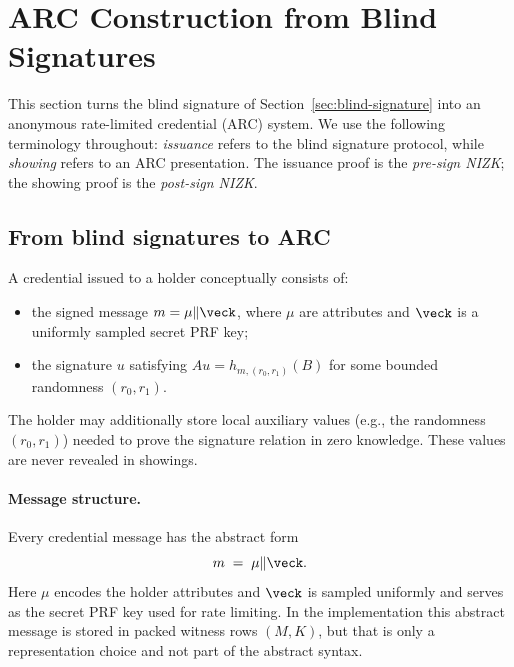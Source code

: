 \section{ARC Construction from Blind Signatures}
\label{sec:arc-construction}

This section turns the blind signature of Section~\ref{sec:blind-signature} into an anonymous rate-limited credential
(ARC) system. We use the following terminology throughout:
\emph{issuance} refers to the blind signature protocol, while \emph{showing} refers to an ARC presentation.
The issuance proof is the \emph{pre-sign NIZK}; the showing proof is the \emph{post-sign NIZK}.

\subsection{From blind signatures to ARC}
A credential issued to a holder conceptually consists of:
\begin{itemize}[leftmargin=1.25em]
  \item the signed message \(m=\mu\Vert \veck\), where \(\mu\) are attributes and \(\veck\) is a uniformly sampled secret PRF key;
  \item the signature \(u\) satisfying \(A u = h_{m,(r_0,r_1)}(B)\) for some bounded randomness \((r_0,r_1)\).
\end{itemize}
The holder may additionally store local auxiliary values (e.g., the randomness \((r_0,r_1)\)) needed to prove the
signature relation in zero knowledge. These values are never revealed in showings.

\paragraph{Message structure.}
Every credential message has the abstract form
\[
  m \;=\; \mu \Vert \veck.
\]
Here \(\mu\) encodes the holder attributes and \(\veck\) is sampled uniformly and serves as the secret PRF key used for
rate limiting. In the implementation this abstract message is stored in packed witness rows \((M,K)\), but that is
only a representation choice and not part of the abstract syntax.


